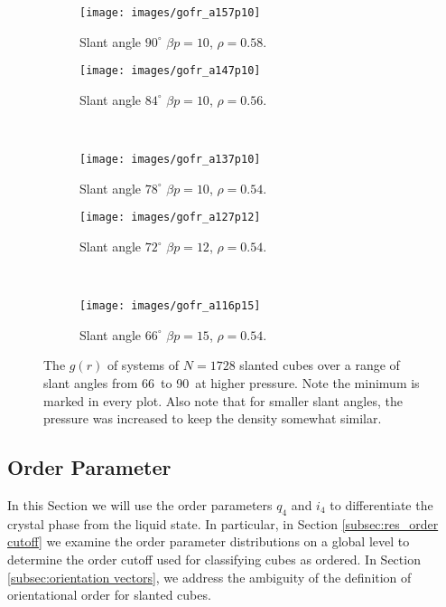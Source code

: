 \documentclass[thesis]{subfiles}
\begin{document}
\begin{figure}[H]
	\centering
	\begin{subfigure}{0.49\textwidth}
	\texttt{[image: images/gofr\_a157p10]}
	\caption{Slant angle $90^\circ$ $\beta p = 10$, $\rho = 0.58$. }
	\end{subfigure}
	\begin{subfigure}{0.49\textwidth}
		\texttt{[image: images/gofr\_a147p10]}
		\caption{Slant angle $84^\circ$ $\beta p = 10$, $\rho = 0.56$. }
	\end{subfigure}
\\\vspace{10pt}
	\begin{subfigure}{0.49\textwidth}
		\texttt{[image: images/gofr\_a137p10]}
		\caption{Slant angle $78^\circ$ $\beta p = 10$, $\rho = 0.54$. }
	\end{subfigure}
	\begin{subfigure}{0.49\textwidth}
		\texttt{[image: images/gofr\_a127p12]}
		\caption{Slant angle $72^\circ$ $\beta p = 12$, $\rho = 0.54$. }
	\end{subfigure}
\\\vspace{10pt}
	\begin{subfigure}{0.49\textwidth}
		\texttt{[image: images/gofr\_a116p15]}
		\caption{Slant angle $66^\circ$ $\beta p = 15$, $\rho = 0.54$. }
	\end{subfigure}
	
	\caption{The $g(r)$ of systems of $N = 1728$ slanted cubes over a range of slant angles from 66\degr\ to 90\degr\ at higher pressure. Note the minimum is marked in every plot. Also note that for smaller slant angles, the pressure was increased to keep the density somewhat similar.}\label{fig:gofr_Xtal}
\end{figure}

\subsection{Order Parameter} \label{subsec:order}

In this Section we will use the order parameters $q_4$ and $i_4$ to differentiate the crystal phase from the liquid state. In particular, in Section \ref{subsec:res_order cutoff} we examine the order parameter distributions on a global level to determine the order cutoff used for classifying cubes as ordered. In Section \ref{subsec:orientation vectors}, we address the ambiguity of the definition of orientational order for slanted cubes.
\end{document}
